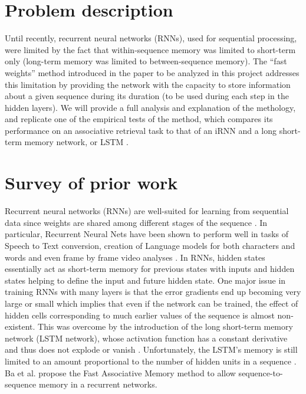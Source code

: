 \section{Problem description}

Until recently, recurrent neural networks (RNNs), used for sequential processing, were limited by the fact that within-sequence memory was limited to short-term only (long-term memory was limited to between-sequence memory). The ``fast weights'' method introduced in the paper to be analyzed in this project \cite{DBLP:conf/nips/BaHMLI16} addresses this limitation by providing the network with the capacity to store information about a given sequence during its duration (to be used during each step in the hidden layers). We will provide a full analysis and explanation of the methology, and replicate one of the empirical tests of the method, which compares its performance on an associative retrieval task to that of an iRNN and a long short-term memory network, or LSTM \cite{DBLP:journals/neco/HochreiterS97}.

\section{Survey of prior work}

Recurrent neural networks (RNNs) are well-suited for learning from sequential data since weights are shared among different stages of the sequence \cite[p. 373]{Goodfellow-et-al-2016}. In particular, Recurrent Neural Nets have been shown to perform well in tasks of Speech to Text conversion, creation of Language models for both characters and words \cite{DBLP:conf/icml/SutskeverMH11} and even frame by frame video analyses \cite{mnih}. In RNNs, hidden states essentially act as short-term memory for previous states with inputs and hidden states helping to define the input and future hidden state. One major issue in training RNNs with many layers is that the error gradients end up becoming very large or small \cite[p. 16]{DBLP:journals/nn/Schmidhuber15} which implies that even if the network can be trained, the effect of hidden cells corresponding to much earlier values of the sequence is almost non-existent. This was overcome by the introduction of the long short-term memory network (LSTM network), whose activation function has a constant derivative and thus does not explode or vanish \cite[p. 19]{DBLP:journals/nn/Schmidhuber15}. Unfortunately, the LSTM's memory is still limited to an amount proportional to the number of hidden units in a sequence \cite[p. 1]{DBLP:conf/nips/BaHMLI16}. Ba et al. propose the Fast Associative Memory method to allow sequence-to-sequence memory in a recurrent networks.

